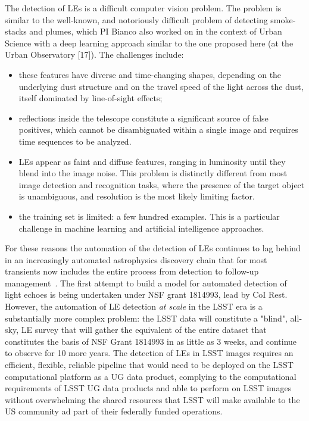 \documentclass{proposalnsf}
\begin{document}
The detection of LEs is a difficult computer vision problem.   The problem is similar to the well-known, and notoriously difficult problem of detecting smoke-stacks and plumes, which PI Bianco also worked on in the context of Urban Science with a deep learning approach similar to the one proposed here (at the Urban Observatory [17]).  
The challenges include:
\begin{itemize}
  \item these features have diverse and time-changing shapes, depending on the underlying dust structure and on the travel speed of the light across the dust, itself dominated by line-of-sight effects;
  \item reflections inside the telescope constitute a significant source of false positives, which cannot be disambiguated within a single image and requires time sequences to be analyzed.
  \item LEs appear as faint and diffuse features, ranging in luminosity until they blend into the image noise.   This problem is distinctly different from most image detection and recognition tasks, where the presence of the target object is unambiguous, and resolution is the most likely limiting factor.   
  \item the training set is limited: a few hundred examples.   This is a particular challenge in machine learning and artificial intelligence approaches. 
  \end{itemize}
 For these reasons the automation of the detection of LEs continues to lag behind in an increasingly automated astrophysics discovery chain that for most transients now includes the entire process from detection to follow-up management~\citep{street18}. The first attempt to build a model for automated detection of light echoes is being undertaken under NSF grant 1814993, lead by CoI Rest. However, the automation of LE detection \emph{at scale} in the LSST era is a substantially more complex problem: the LSST data will constitute a "blind", all-sky, LE survey that will gather the equivalent of the entire dataset that constitutes the basis of NSF Grant 1814993 in as little as 3 weeks, and continue to observe for 10 more years. The detection of LEs in LSST images requires an efficient, flexible, reliable pipeline that would need to be deployed on the LSST computational platform as a UG data product, complying to the computational requirements of LSST UG data products and able to perform on LSST images without overwhelming the shared resources that LSST will make available to the US community ad part of their federally funded operations. 
\end{document}
